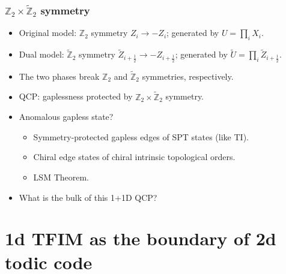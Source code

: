 \documentclass[xcolor=table, 10pt, aspectratio=169]{beamer}
\begin{document}
\begin{frame}
  \frametitle{$\mathbb Z_2\times\tilde{\mathbb Z}_2$ symmetry}
  \begin{itemize}
    \item Original model: $\mathbb Z_2$ symmetry $Z_i\rightarrow -Z_i$; generated by $U=\prod_iX_i$.
    \item Dual model: $\tilde{\mathbb Z}_2$ symmetry $\tilde Z_{i+\frac12}\rightarrow -Z_{i+\frac12}$; generated by $\tilde U=\prod_i\tilde Z_{i+\frac12}$.
    \item The two phases break $\mathbb Z_2$ and $\tilde{\mathbb Z}_2$ symmetries, respectively.
  \end{itemize}
  \begin{center}
  \end{center}
  \begin{itemize}
    \item QCP: gaplessness protected by $\mathbb Z_2\times\tilde{\mathbb Z}_2$ symmetry.
    \item Anomalous gapless state?
    \begin{itemize}
      \item Symmetry-protected gapless edges of SPT states (like TI).
      \item Chiral edge states of chiral intrinsic topological orders.
      \item LSM Theorem.
    \end{itemize}
    \item What is the bulk of this 1+1D QCP?
  \end{itemize}
\end{frame}

\section{1d TFIM as the boundary of 2d todic code}
\end{document}
